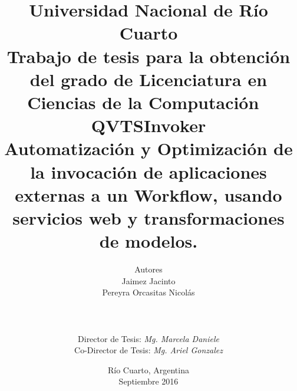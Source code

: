 \documentclass[oneside,letterpaper,10pt, spanish]{report}
\begin{document}
	
	
	\title{
		Universidad Nacional de Río Cuarto\\
		$\;$\\
		$\;$\\
		\small{Trabajo de tesis para la obtención del grado de Licenciatura en Ciencias de la Computación}
		$\;$\\$\;$\\
		\Large{\textbf{QVTSInvoker\\
				Automatización y Optimización de la invocación de aplicaciones externas a un Workflow, usando servicios web y transformaciones de modelos.
				 }}
	} 
	
	\author{
		Autores\\
		Jaimez Jacinto \\
		Pereyra Orcasitas Nicolás\\
		\\ \\ \\
		Director de Tesis: \emph{Mg. Marcela Daniele}\\ 
		Co-Director de Tesis: \emph{Mg. Ariel Gonzalez}\\ 
	}
	
	\date{Río Cuarto, Argentina\\ Septiembre 2016}
	
	
	\maketitle
	
\newpage
\mbox{}
\thispagestyle{empty} %





\listoffigures
{} %
\tableofcontents %

















\printindex
\end{document}
